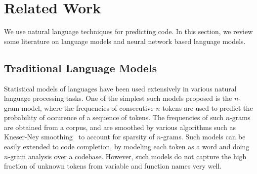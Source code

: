 \section{Related Work}
\label{sec:related}

We use natural language techniques for predicting code.
In this section, we review some literature on language models and
neural network based language models.

\subsection{Traditional Language Models}
Statistical models of languages have been used extensively in various natural
language processing tasks. One of the simplest such models proposed is the
$n$-gram model, where the frequencies of consecutive $n$ tokens are used to
predict the probability of occurence of a sequence of tokens. The frequencies of
such $n$-grams are obtained from a corpus, and are smoothed by various
algorithms such as Kneser-Ney smoothing~\cite{ref:kneser-ney} to account for
sparsity of $n$-grams. Such models can be easily extended to code completion,
by modeling each token as a word and doing $n$-gram analysis over a
codebase. However, such models do not capture
the high fraction of unknown tokens from variable and function names very well.

